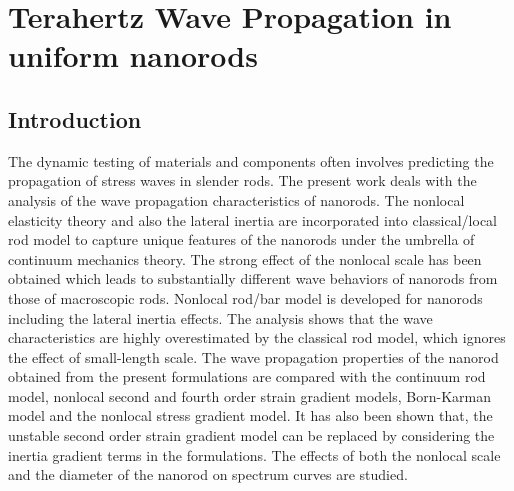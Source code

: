 \section{Terahertz Wave Propagation in uniform nanorods}
\subsection*{Introduction}
The dynamic testing of materials and components often involves predicting the propagation of stress waves in slender rods. The present work deals with the analysis of the wave propagation characteristics of nanorods. The nonlocal elasticity theory and also the lateral inertia are incorporated into classical/local rod model to capture unique features of the nanorods under the umbrella of continuum mechanics theory.
The strong effect of the nonlocal scale has been obtained which leads to substantially different wave behaviors of nanorods from those of macroscopic rods. Nonlocal rod/bar model is developed for nanorods including the lateral inertia effects. The analysis shows that the wave characteristics are highly overestimated by the classical rod model, which ignores the effect of small-length scale. The wave propagation properties of the nanorod obtained from the present formulations are compared with the continuum rod model, nonlocal second and fourth order strain gradient models, Born-Karman model and the nonlocal
stress gradient model. It has also been shown that, the unstable second order strain gradient model can be replaced by considering the inertia gradient terms in the formulations. The effects of both the nonlocal scale and the diameter of the nanorod on spectrum curves are studied.

